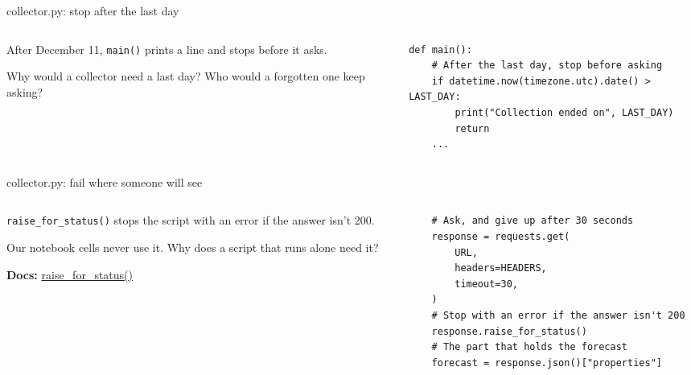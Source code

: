 \documentclass[9pt,aspectratio=169]{beamer}
\begin{document}
\begin{frame}[fragile]{collector.py: stop after the last day}
    \begin{columns}[T]
        \begin{column}{0.37\textwidth}
            After December 11, \texttt{main()} prints a line and stops before it asks.

            \medskip
            Why would a collector need a last day? Who would a forgotten one keep asking?
        \end{column}
        \begin{column}{0.6\textwidth}
\begin{lstlisting}
def main():
    # After the last day, stop before asking
    if datetime.now(timezone.utc).date() > LAST_DAY:
        print("Collection ended on", LAST_DAY)
        return
    ...
\end{lstlisting}
        \end{column}
    \end{columns}
\end{frame}

\begin{frame}[fragile]{collector.py: fail where someone will see}
    \begin{columns}[T]
        \begin{column}{0.37\textwidth}
            \texttt{raise\_for\_status()} stops the script with an error if the answer isn't 200.

            \medskip
            Our notebook cells never use it. Why does a script that runs alone need it?

            \medskip
            {\scriptsize\textbf{Docs:} \href{https://requests.readthedocs.io/en/stable/api/\#requests.Response.raise_for_status}{raise\_for\_status()}\par}
        \end{column}
        \begin{column}{0.6\textwidth}
\begin{lstlisting}
    # Ask, and give up after 30 seconds
    response = requests.get(
        URL,
        headers=HEADERS,
        timeout=30,
    )
    # Stop with an error if the answer isn't 200
    response.raise_for_status()
    # The part that holds the forecast
    forecast = response.json()["properties"]
\end{lstlisting}
        \end{column}
    \end{columns}
\end{frame}
\end{document}
